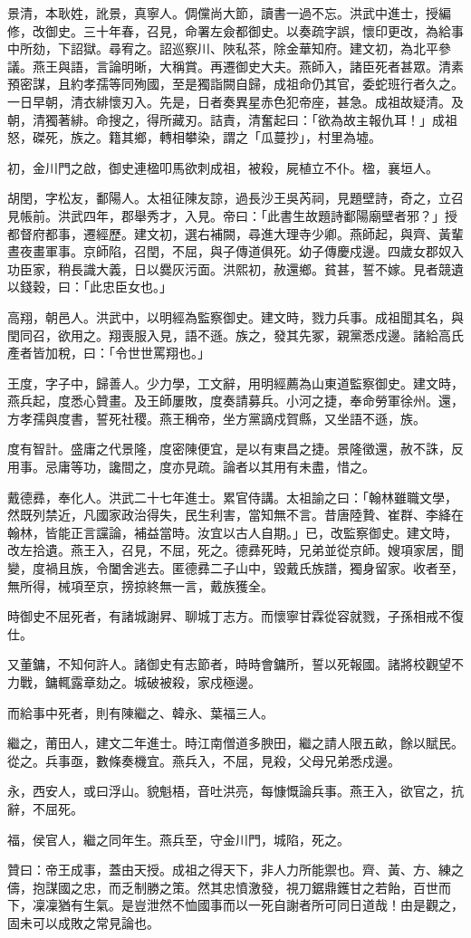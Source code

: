 \begin{pinyinscope}
景清，本耿姓，訛景，真寧人。倜儻尚大節，讀書一過不忘。洪武中進士，授編修，改御史。三十年春，召見，命署左僉都御史。以奏疏字誤，懷印更改，為給事中所劾，下詔獄。尋宥之。詔巡察川、陜私茶，除金華知府。建文初，為北平參議。燕王與語，言論明晰，大稱賞。再遷御史大夫。燕師入，諸臣死者甚眾。清素預密謀，且約孝孺等同殉國，至是獨詣闕自歸，成祖命仍其官，委蛇班行者久之。一日早朝，清衣緋懷刃入。先是，日者奏異星赤色犯帝座，甚急。成祖故疑清。及朝，清獨著緋。命搜之，得所藏刃。詰責，清奮起曰：「欲為故主報仇耳！」成祖怒，磔死，族之。籍其鄉，轉相攀染，謂之「瓜蔓抄」，村里為墟。

初，金川門之啟，御史連楹叩馬欲刺成祖，被殺，屍植立不仆。楹，襄垣人。

胡閏，字松友，鄱陽人。太祖征陳友諒，過長沙王吳芮祠，見題壁詩，奇之，立召見帳前。洪武四年，郡舉秀才，入見。帝曰：「此書生故題詩鄱陽廟壁者邪？」授都督府都事，遷經歷。建文初，選右補闕，尋進大理寺少卿。燕師起，與齊、黃輩晝夜畫軍事。京師陷，召閏，不屈，與子傳道俱死。幼子傳慶戍邊。四歲女郡奴入功臣家，稍長識大義，日以爨灰污面。洪熙初，赦還鄉。貧甚，誓不嫁。見者競遺以錢穀，曰：「此忠臣女也。」

高翔，朝邑人。洪武中，以明經為監察御史。建文時，戮力兵事。成祖聞其名，與閏同召，欲用之。翔喪服入見，語不遜。族之，發其先冢，親黨悉戍邊。諸給高氏產者皆加稅，曰：「令世世罵翔也。」

王度，字子中，歸善人。少力學，工文辭，用明經薦為山東道監察御史。建文時，燕兵起，度悉心贊畫。及王師屢敗，度奏請募兵。小河之捷，奉命勞軍徐州。還，方孝孺與度書，誓死社稷。燕王稱帝，坐方黨謫戍賀縣，又坐語不遜，族。

度有智計。盛庸之代景隆，度密陳便宜，是以有東昌之捷。景隆徵還，赦不誅，反用事。忌庸等功，讒間之，度亦見疏。論者以其用有未盡，惜之。

戴德彞，奉化人。洪武二十七年進士。累官侍講。太祖諭之曰：「翰林雖職文學，然既列禁近，凡國家政治得失，民生利害，當知無不言。昔唐陸贄、崔群、李絳在翰林，皆能正言讜論，補益當時。汝宜以古人自期。」已，改監察御史。建文時，改左拾遺。燕王入，召見，不屈，死之。德彞死時，兄弟並從京師。嫂項家居，聞變，度禍且族，令闔舍逃去。匿德彞二子山中，毀戴氏族譜，獨身留家。收者至，無所得，械項至京，搒掠終無一言，戴族獲全。

時御史不屈死者，有諸城謝昇、聊城丁志方。而懷寧甘霖從容就戮，子孫相戒不復仕。

又董鏞，不知何許人。諸御史有志節者，時時會鏞所，誓以死報國。諸將校觀望不力戰，鏞輒露章劾之。城破被殺，家戍極邊。

而給事中死者，則有陳繼之、韓永、葉福三人。

繼之，莆田人，建文二年進士。時江南僧道多腴田，繼之請人限五畝，餘以賦民。從之。兵事亟，數條奏機宜。燕兵入，不屈，見殺，父母兄弟悉戍邊。

永，西安人，或曰浮山。貌魁梧，音吐洪亮，每慷慨論兵事。燕王入，欲官之，抗辭，不屈死。

福，侯官人，繼之同年生。燕兵至，守金川門，城陷，死之。

贊曰：帝王成事，蓋由天授。成祖之得天下，非人力所能禦也。齊、黃、方、練之儔，抱謀國之忠，而乏制勝之策。然其忠憤激發，視刀鋸鼎鑊甘之若飴，百世而下，凜凜猶有生氣。是豈泄然不恤國事而以一死自謝者所可同日道哉！由是觀之，固未可以成敗之常見論也。


\end{pinyinscope}